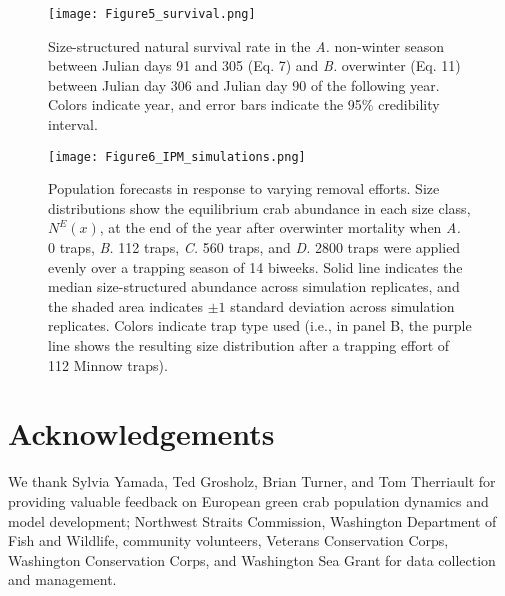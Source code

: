 \documentclass{article}
\begin{document}
\begin{figure}[H]
    \centering
    \texttt{[image: Figure5\_survival.png]}
    \caption{Size-structured natural survival rate in the \textit{A.} non-winter season between Julian days 91 and 305 (Eq. 7) and \textit{B.} overwinter (Eq. 11) between Julian day 306 and Julian day 90 of the following year. Colors indicate year, and error bars indicate the 95\% credibility interval.}
\end{figure}

\begin{figure}[H]
    \centering
    \texttt{[image: Figure6\_IPM\_simulations.png]}
    \caption{Population forecasts in response to varying removal efforts. Size distributions show the equilibrium crab abundance in each size class, $N^E(x)$, at the end of the year after overwinter mortality when \textit{A.} 0 traps, \textit{B.} 112 traps, \textit{C.} 560 traps, and \textit{D.} 2800 traps were applied evenly over a trapping season of 14 biweeks. Solid line indicates the median size-structured abundance across simulation replicates, and the shaded area indicates $\pm1$ standard deviation across simulation replicates. Colors indicate trap type used (i.e., in panel B, the purple line shows the resulting size distribution after a trapping effort of 112 Minnow traps).}
\end{figure}

\section{Acknowledgements}

We thank Sylvia Yamada, Ted Grosholz, Brian Turner, and Tom Therriault for providing valuable feedback on European green crab population dynamics and model development; Northwest Straits Commission, Washington Department of Fish and Wildlife, community volunteers, Veterans Conservation Corps, Washington Conservation Corps, and Washington Sea Grant for data collection and management.  

\printbibliography[]
\end{document}
